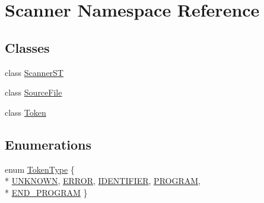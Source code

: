 \hypertarget{namespace_scanner}{}\section{Scanner Namespace Reference}
\label{namespace_scanner}
\subsection*{Classes}
\begin{DoxyCompactItemize}
\item 
class \hyperlink{class_scanner_1_1_scanner_s_t}{Scanner\+ST}
\item 
class \hyperlink{class_scanner_1_1_source_file}{Source\+File}
\item 
class \hyperlink{class_scanner_1_1_token}{Token}
\end{DoxyCompactItemize}
\subsection*{Enumerations}
\begin{DoxyCompactItemize}
\item 
enum \hyperlink{namespace_scanner_a1d588ca5cfd26bdff0e59b437da5b166}{Token\+Type} \{ \\*
\hyperlink{namespace_scanner_a1d588ca5cfd26bdff0e59b437da5b166a48ae1c67b152fd4cceb1fc919c07cef3}{U\+N\+K\+N\+O\+WN}, 
\hyperlink{namespace_scanner_a1d588ca5cfd26bdff0e59b437da5b166afa7aaa30e05994a154a6659a8fc5bc0a}{E\+R\+R\+OR}, 
\hyperlink{namespace_scanner_a1d588ca5cfd26bdff0e59b437da5b166ad9fa4b9d9c85ef41caa4540fb385491d}{I\+D\+E\+N\+T\+I\+F\+I\+ER}, 
\hyperlink{namespace_scanner_a1d588ca5cfd26bdff0e59b437da5b166aceb64e2af79584079e0e3f3c32ccaf9d}{P\+R\+O\+G\+R\+AM}, 
\\*
\hyperlink{namespace_scanner_a1d588ca5cfd26bdff0e59b437da5b166a32d6b00cdc94cf860b8d967cb30d7952}{E\+N\+D\+\_\+\+P\+R\+O\+G\+R\+AM}
 \}
\end{DoxyCompactItemize}
